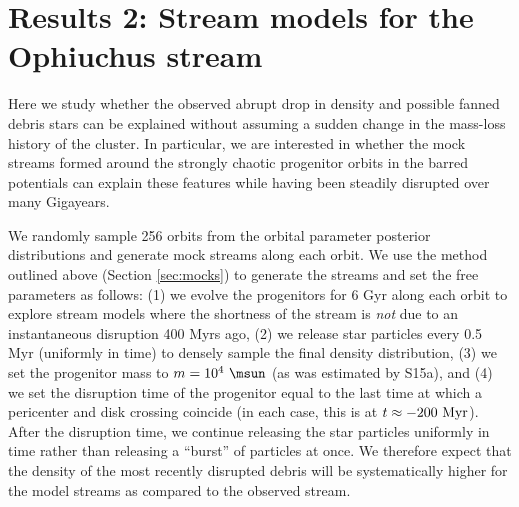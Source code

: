 \documentclass[letterpaper,12pt,preprint]{aastex}
\begin{document}
\section{Results 2: Stream models for the Ophiuchus stream}

Here we study whether the observed abrupt drop in density and possible fanned debris stars can be explained without assuming a sudden change in the mass-loss history of the cluster. In particular, we are interested in whether the mock streams formed around the strongly chaotic progenitor orbits in the barred potentials can explain these features while having been steadily disrupted over many Gigayears.

We randomly sample 256 orbits from the orbital parameter posterior distributions and generate mock streams along each orbit. We use the method outlined above (Section \ref{sec:mocks}) to generate the streams and set the free parameters as follows: (1) we evolve the progenitors for 6 Gyr along each orbit to explore stream models where the shortness of the stream is \emph{not} due to an instantaneous disruption 400 Myrs ago, (2) we release star particles every 0.5 Myr (uniformly in time) to densely sample the final density distribution, (3) we set the progenitor mass to $m=10^4~\msun$ (as was estimated by S15a), and (4) we set the disruption time of the progenitor equal to the last time at which a pericenter and disk crossing coincide (in each case, this is at $t \approx -200~{\rm Myr}$). After the disruption time, we continue releasing the star particles uniformly in time rather than releasing a ``burst'' of particles at once. We therefore expect that the density of the most recently disrupted debris will be systematically higher for the model streams as compared to the observed stream.
\end{document}
